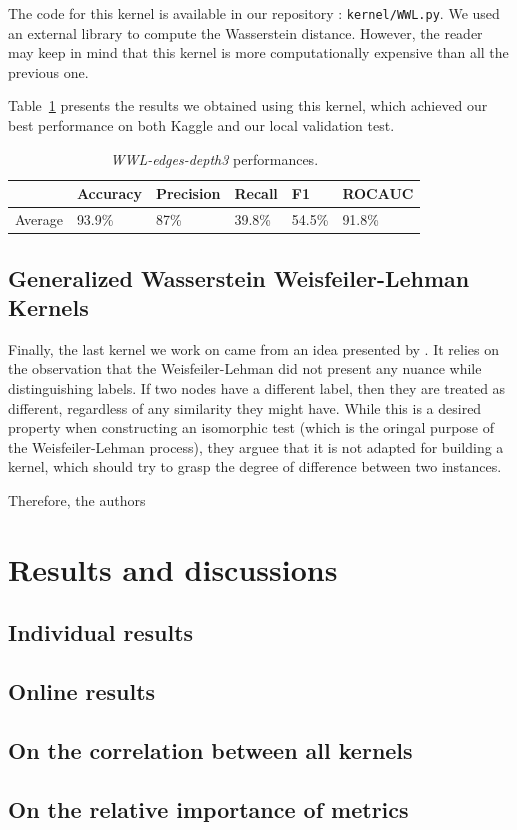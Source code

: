 \documentclass{IEEEtran}
\begin{document}
The code for this kernel is available in our repository : \texttt{kernel/WWL.py}.
We used an external library to compute the Wasserstein distance.
However, the reader may keep in mind that this kernel is more
computationally expensive than all the previous one.

Table~\ref{tab:wwl} presents the results we obtained using this kernel, which achieved our best performance on both Kaggle and our local validation test.

\begin{table}[h]
    \centering
    \begin{tabular}{l|llll|l}
                & Accuracy & Precision & Recall & F1     & ROCAUC \\
        \hline
        Average & 93.9\%   & 87\%      & 39.8\% & 54.5\% & 91.8\% \\
    \end{tabular}
    \caption{\emph{WWL-edges-depth3} performances.}
    \label{tab:wwl}
\end{table}

\subsection{Generalized Wasserstein Weisfeiler-Lehman Kernels}
Finally, the last kernel we work on came from an idea presented by \cite{schulz2022generalized}.
It relies on the observation that the Weisfeiler-Lehman
did not present any nuance while distinguishing labels.
If two nodes have a different label, then they are treated as different,
regardless of any similarity they might have.
While this is a desired property when constructing an
isomorphic test (which is the oringal purpose of the Weisfeiler-Lehman process),
they arguee that it is not adapted for building a kernel, which should try to grasp
the degree of difference between two instances.

Therefore, the authors



\section{Results and discussions}
\subsection{Individual results}
\subsection{Online results}
\subsection{On the correlation between all kernels}
\subsection{On the relative importance of metrics}



\end{document}
